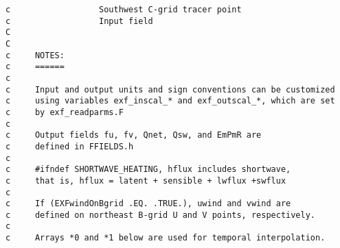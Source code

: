 {\begin{verbatim}
c                  Southwest C-grid tracer point
c                  Input field
C
C
c     NOTES:
c     ======
c
c     Input and output units and sign conventions can be customized
c     using variables exf_inscal_* and exf_outscal_*, which are set
c     by exf_readparms.F
c
c     Output fields fu, fv, Qnet, Qsw, and EmPmR are
c     defined in FFIELDS.h
c
c     #ifndef SHORTWAVE_HEATING, hflux includes shortwave,
c     that is, hflux = latent + sensible + lwflux +swflux
c
c     If (EXFwindOnBgrid .EQ. .TRUE.), uwind and vwind are
c     defined on northeast B-grid U and V points, respectively.
c
c     Arrays *0 and *1 below are used for temporal interpolation.
\end{verbatim}
}

